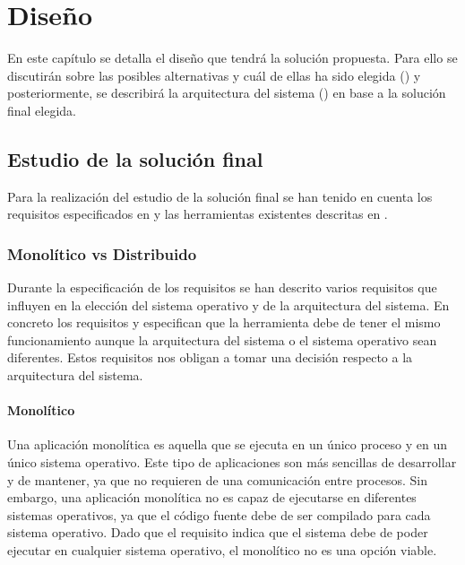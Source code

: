\chapter{Diseño}\label{chap:diseno}

En este capítulo se detalla el diseño que tendrá la solución propuesta. Para ello se discutirán sobre las posibles alternativas y cuál de ellas ha sido elegida () y posteriormente, se describirá la arquitectura del sistema () en base a la solución final elegida.

\section{Estudio de la solución final}\label{sec:estudio-solucion-final}

Para la realización del estudio de la solución final se han tenido en cuenta los requisitos especificados en  y las herramientas existentes descritas en . 

\subsection{Monolítico vs Distribuido} \label{subsec:monolitico-vs-distribuido}

Durante la especificación de los requisitos se han descrito varios requisitos que influyen en la elección del sistema operativo y de la arquitectura del sistema. En concreto los requisitos  y  especifican que la herramienta debe de tener el mismo funcionamiento aunque la arquitectura del sistema o el sistema operativo sean diferentes. Estos requisitos nos obligan a tomar una decisión respecto a la arquitectura del sistema. 

\subsubsection{Monolítico} \label{subsubsec:monolitico}

Una aplicación monolítica es aquella que se ejecuta en un único proceso y en un único sistema operativo. Este tipo de aplicaciones son más sencillas de desarrollar y de mantener, ya que no requieren de una comunicación entre procesos. Sin embargo, una aplicación monolítica no es capaz de ejecutarse en diferentes sistemas operativos, ya que el código fuente debe de ser compilado para cada sistema operativo. Dado que el requisito  indica que el sistema debe de poder ejecutar en cualquier sistema operativo, el monolítico no es una opción viable.

